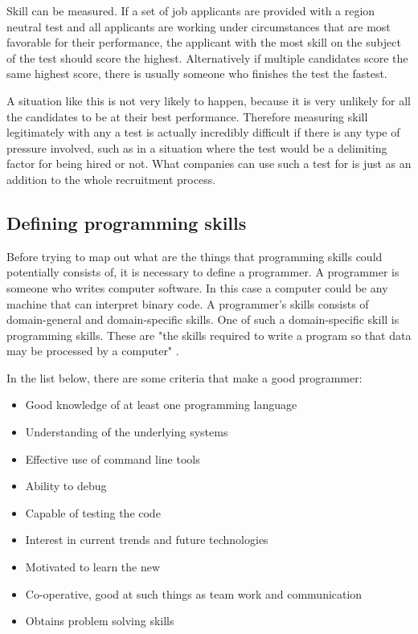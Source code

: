 \documentclass[11pt,a4paper,oneside,article]{memoir}
\begin{document}
Skill can be measured. If a set of job applicants are provided with a region neutral test and all applicants are working under circumstances that are most favorable for their performance, the applicant with the most skill on the subject of the test should score the highest. Alternatively if multiple candidates score the same highest score, there is usually someone who finishes the test the fastest. 

A situation like this is not very likely to happen, because it is very unlikely for all the candidates to be at their best performance. Therefore measuring skill legitimately with any a test is actually incredibly difficult if there is any type of pressure involved, such as in a situation where the test would be a delimiting factor for being hired or not. What companies can use such a test for is just as an addition to the whole recruitment process.

\subsection{Defining programming skills}

Before trying to map out what are the things that programming skills could potentially consists of, it is necessary to define a programmer. A programmer is someone who writes computer software. In this case a computer could be any machine that can interpret binary code. A programmer's skills consists of domain-general and domain-specific skills. One of such a domain-specific skill is programming skills. These are "the skills required to write a program so that data may be processed by a computer" \cite{collins:skills}.  

In the list below, there are some criteria that make a good programmer:
\vspace{-17pt} 
\begin{itemize}
\item Good knowledge of at least one programming language
\item Understanding of the underlying systems
\item Effective use of command line tools
\item Ability to debug
\item Capable of testing the code
\item Interest in current trends and future technologies
\item Motivated to learn the new
\item Co-operative, good at such things as team work and communication
\item Obtains problem solving skills \cite{johnson:good}
\end{itemize}
\vspace{-17pt}
\end{document}
